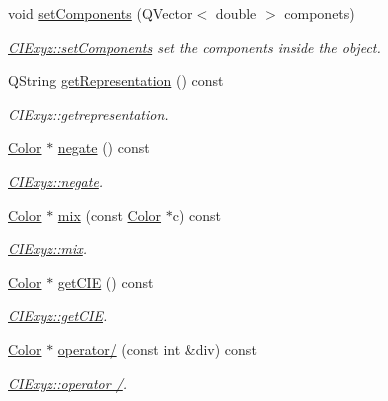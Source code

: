 \begin{DoxyCompactItemize}
void \hyperlink{class_c_i_exyz_a11468574f91d2cb1356f0cde56429b84}{set\+Components} (Q\+Vector$<$ double $>$ componets)
\begin{DoxyCompactList}\small\item\em \hyperlink{class_c_i_exyz_a11468574f91d2cb1356f0cde56429b84}{C\+I\+Exyz\+::set\+Components} set the components inside the object. \end{DoxyCompactList}\item 
Q\+String \hyperlink{class_c_i_exyz_a19120c15d1304696909d76fae6065ebd}{get\+Representation} () const
\begin{DoxyCompactList}\small\item\em C\+I\+Exyz\+::getrepresentation. \end{DoxyCompactList}\item 
\hyperlink{class_color}{Color} $\ast$ \hyperlink{class_c_i_exyz_a4a454df6cbb71f3fcfd2d1ea9d500d94}{negate} () const
\begin{DoxyCompactList}\small\item\em \hyperlink{class_c_i_exyz_a4a454df6cbb71f3fcfd2d1ea9d500d94}{C\+I\+Exyz\+::negate}. \end{DoxyCompactList}\item 
\hyperlink{class_color}{Color} $\ast$ \hyperlink{class_c_i_exyz_af8eeb48ade44beea43d023b36d263fc8}{mix} (const \hyperlink{class_color}{Color} $\ast$c) const
\begin{DoxyCompactList}\small\item\em \hyperlink{class_c_i_exyz_af8eeb48ade44beea43d023b36d263fc8}{C\+I\+Exyz\+::mix}. \end{DoxyCompactList}\item 
\hyperlink{class_color}{Color} $\ast$ \hyperlink{class_c_i_exyz_aa93c7a293b63c7bce8d1fab9a185ab1b}{get\+C\+IE} () const
\begin{DoxyCompactList}\small\item\em \hyperlink{class_c_i_exyz_aa93c7a293b63c7bce8d1fab9a185ab1b}{C\+I\+Exyz\+::get\+C\+IE}. \end{DoxyCompactList}\item 
\hyperlink{class_color}{Color} $\ast$ \hyperlink{class_c_i_exyz_abb3f5e1c8a923d7758e6bbe83b71f4fa}{operator/} (const int \&div) const
\begin{DoxyCompactList}\small\item\em \hyperlink{class_c_i_exyz_abb3f5e1c8a923d7758e6bbe83b71f4fa}{C\+I\+Exyz\+::operator /}. \end{DoxyCompactList}\item 

\end{DoxyCompactItemize}
